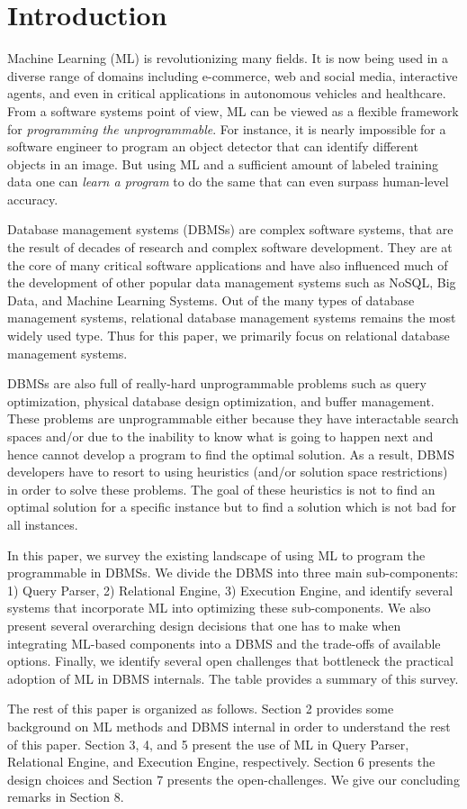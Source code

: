 \section{Introduction}

Machine Learning (ML) is revolutionizing many fields.
It is now being used in a diverse range of domains including e-commerce, web and social media, interactive agents, and even in critical applications in autonomous vehicles and healthcare.
From a software systems point of view, ML can be viewed as a flexible framework for \textit{programming the unprogrammable}.
For instance, it is nearly impossible for a software engineer to program an object detector that can identify different objects in an image.
But using ML and a sufficient amount of labeled training data one can \textit{learn a program} to do the same that can even surpass human-level accuracy.

Database management systems (DBMSs) are complex software systems, that are the result of decades of research and complex software development.
They are at the core of many critical software applications and have also influenced much of the development of other popular data management systems such as NoSQL, Big Data, and Machine Learning Systems.
Out of the many types of database management systems, relational database management systems remains the most widely used type.
Thus for this paper, we primarily focus on relational database management systems.

DBMSs are also full of really-hard unprogrammable problems such as query optimization, physical database design optimization, and buffer management.
These problems are unprogrammable either because they have interactable search spaces and/or due to the inability to know what is going to happen next and hence cannot develop a program to find the optimal solution.
As a result, DBMS developers have to resort to using heuristics (and/or solution space restrictions) in order to solve these problems.
The goal of these heuristics is not to find an optimal solution for a specific instance but to find a solution which is not bad for all instances.

In this paper, we survey the existing landscape of using ML to program the programmable in DBMSs. 
We divide the DBMS into three main sub-components: 1) Query Parser, 2) Relational Engine, 3) Execution Engine, and identify several systems that incorporate ML into optimizing these sub-components. 
We also present several overarching design decisions that one has to make when integrating ML-based components into a DBMS and the trade-offs of available options.
Finally, we identify several open challenges that bottleneck the practical adoption of ML in DBMS internals.
The table provides a summary of this survey.

The rest of this paper is organized as follows.
Section 2 provides some background on ML methods and DBMS internal in order to understand the rest of this paper.
Section 3, 4, and 5 present the use of ML in Query Parser, Relational Engine, and Execution Engine, respectively.
Section 6 presents the design choices and Section 7 presents the open-challenges.
We give our concluding remarks in Section 8.